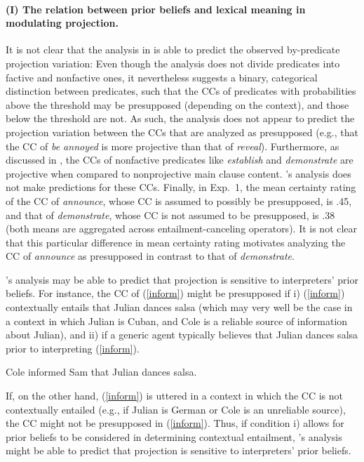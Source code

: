 \documentclass[11pt,fleqn]{article}
\newcommand{\6}{\mbox{$[\hspace*{-.6mm}[$}}
\newcommand{\9}{\mbox{$]\hspace*{-.6mm}]$}}
\newcommand{\citepos}[1]{\citeauthor{#1}'s \citeyear{#1}}
\begin{document}
\paragraph{(I) The relation between prior beliefs and lexical meaning in modulating projection.} It is not clear that the analysis in \citealt{schlenker2021} is able to predict the observed by-predicate projection variation: Even though the analysis does not divide predicates into factive and nonfactive ones, it nevertheless suggests a binary, categorical distinction between predicates, such that the CCs of predicates with probabilities above the threshold may be presupposed (depending on the context), and those below the threshold are not. As such, the analysis does not appear to predict the projection variation between the CCs that are analyzed as presupposed (e.g., that the CC of {\em be annoyed} is more projective than that of {\em reveal}). Furthermore, as discussed in \citealt{degen-tonhauser-language}, the CCs of nonfactive predicates like \emph{establish} and \emph{demonstrate} are projective when compared to nonprojective main clause content. \citepos{schlenker2021} analysis does not make predictions for these CCs. Finally, in Exp.~1, the mean certainty rating of the CC of \emph{announce}, whose CC is assumed to possibly be presupposed, is .45, and that of {\em demonstrate}, whose CC is not assumed to be presupposed, is .38 (both means are aggregated across entailment-canceling operators). It is not clear that this particular difference in mean certainty rating motivates analyzing the CC of \emph{announce} as presupposed in contrast to that of \emph{demonstrate}.

\citepos{schlenker2021} analysis may be able to predict that projection is sensitive to interpreters' prior beliefs. For instance, the CC of (\ref{inform}) might be presupposed if  i) (\ref{inform}) contextually entails that Julian dances salsa (which may very well be the case in a context in which Julian is Cuban, and Cole is a reliable source of information about Julian), and ii) if a generic agent typically believes that Julian dances salsa prior to interpreting (\ref{inform}). 

\begin{exe}
\ex\label{inform} Cole informed Sam that Julian dances salsa.
\end{exe}
If, on the other hand, (\ref{inform}) is uttered in a context in which the CC is not contextually entailed (e.g., if Julian is German or Cole is an unreliable source), the CC might not be presupposed in (\ref{inform}). Thus, if condition i) allows for prior beliefs to be considered in determining contextual entailment, \citepos{schlenker2021} analysis might be able to predict that projection is sensitive to interpreters' prior beliefs. 
\end{document}
